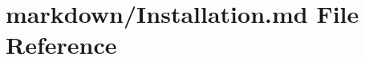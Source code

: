 \hypertarget{Installation_8md}{\section{markdown/\-Installation.md File Reference}
\label{Installation_8md}
}
